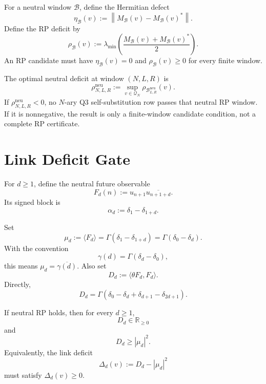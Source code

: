 \begin{definition}
\label{def:innovation-input-hermitian-rp-deficit}
For a neutral window $\mathcal B$, define the Hermitian defect
$$
\eta_{\mathcal B}(v)
:=
\left\|M_{\mathcal B}(v)-M_{\mathcal B}(v)^*\right\|.
$$
Define the RP deficit by
$$
\rho_{\mathcal B}(v)
:=
\lambda_{\min}
\left(
\frac{M_{\mathcal B}(v)+M_{\mathcal B}(v)^*}{2}
\right).
$$
An RP candidate must have $\eta_{\mathcal B}(v)=0$ and
$\rho_{\mathcal B}(v)\ge0$ for every finite window.
\end{definition}

\begin{definition}
\label{def:innovation-input-optimal-neutral-window-deficit}
The optimal neutral deficit at window $(N,L,R)$ is
$$
\rho_{N,L,R}^{\mathrm{neu}}
:=
\sup_{v\in\mathcal Q_N}
\rho_{\mathcal B_{L,R}^{\mathrm{neu}}}(v).
$$
If $\rho_{N,L,R}^{\mathrm{neu}}<0$, no $N$-ary Q3 self-substitution row
passes that neutral RP window. If it is nonnegative, the result is only a
finite-window candidate condition, not a complete RP certificate.
\end{definition}

\section{Link Deficit Gate}
\label{sec:innovation-input-link-deficit-gate}

\begin{definition}
\label{def:innovation-input-link-observable}
For $d\ge1$, define the neutral future observable
$$
F_d(n):=u_{n+1}\overline{u_{n+1+d}}.
$$
Its signed block is
$$
\alpha_d:=\delta_1-\delta_{1+d}.
$$
\end{definition}

\begin{definition}
\label{def:innovation-input-link-mean-reflected-diagonal}
Set
$$
\mu_d:=\langle F_d\rangle
=
\Gamma(\delta_1-\delta_{1+d})
=
\Gamma(\delta_0-\delta_d).
$$
With the convention
$$
\gamma(d)=\Gamma(\delta_d-\delta_0),
$$
this means $\mu_d=\overline{\gamma(d)}$. Also set
$$
D_d:=\langle\theta F_d,F_d\rangle.
$$
Directly,
$$
D_d
=
\Gamma(\delta_0-\delta_d+\delta_{d+1}-\delta_{2d+1}).
$$
\end{definition}

\begin{theorem}
\label{thm:innovation-input-link-two-by-two-necessary-condition}
If neutral RP holds, then for every $d\ge1$,
$$
D_d\in\mathbb R_{\ge0}
$$
and
$$
D_d\ge |\mu_d|^2.
$$
Equivalently, the link deficit
$$
\Delta_d(v):=D_d-|\mu_d|^2
$$
must satisfy $\Delta_d(v)\ge0$.
\end{theorem}

